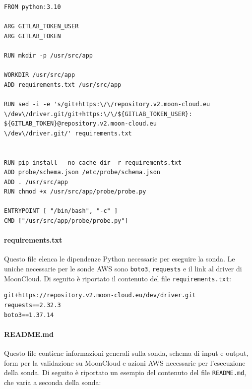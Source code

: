\begin{lstlisting}[style=mydockerfile, caption={\texttt{Dockerfile} per la creazione dell'immagine della sonda}]
FROM python:3.10

ARG GITLAB_TOKEN_USER
ARG GITLAB_TOKEN

RUN mkdir -p /usr/src/app

WORKDIR /usr/src/app 
ADD requirements.txt /usr/src/app 

RUN sed -i -e 's/git+https:\/\/repository.v2.moon-cloud.eu
\/dev\/driver.git/git+https:\/\/${GITLAB_TOKEN_USER}:
${GITLAB_TOKEN}@repository.v2.moon-cloud.eu
\/dev\/driver.git/' requirements.txt


RUN pip install --no-cache-dir -r requirements.txt
ADD probe/schema.json /etc/probe/schema.json
ADD . /usr/src/app
RUN chmod +x /usr/src/app/probe/probe.py

ENTRYPOINT [ "/bin/bash", "-c" ]
CMD ["/usr/src/app/probe/probe.py"]
\end{lstlisting}

\paragraph{requirements.txt} Questo file elenca le dipendenze Python necessarie per eseguire la sonda. Le uniche necessarie per le sonde AWS sono \texttt{boto3}, \texttt{requests} e il link al driver di MoonCloud. Di seguito è riportato il contenuto del file \texttt{requirements.txt}:

\begin{lstlisting}[caption ={File \texttt{requirements.txt} per le dipendenze della sonda}]
git+https://repository.v2.moon-cloud.eu/dev/driver.git
requests==2.32.3
boto3==1.37.14
\end{lstlisting}

\paragraph{README.md} Questo file contiene informazioni generali sulla sonda, schema di input e output, form per la validazione su MoonCloud e azioni AWS necessarie per l'esecuzione della sonda. Di seguito è riportato un esempio del contenuto del file \texttt{README.md}, che varia a seconda della sonda:

